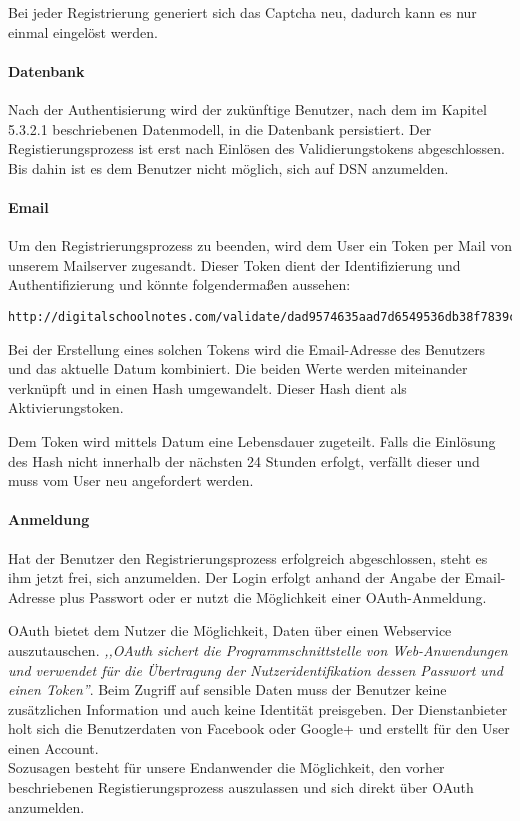 Bei jeder Registrierung generiert sich das Captcha neu, dadurch kann es nur einmal eingelöst werden.


\newpage

\paragraph{Datenbank}
Nach der Authentisierung wird der zukünftige Benutzer, nach dem im Kapitel 5.3.2.1 beschriebenen Datenmodell, in die Datenbank persistiert. Der Registierungsprozess ist erst nach Einlösen des Validierungstokens abgeschlossen. Bis dahin ist es dem Benutzer nicht möglich, sich auf DSN anzumelden.

\paragraph{Email}
Um den Registrierungsprozess zu beenden, wird dem User ein Token per Mail von unserem Mailserver zugesandt. Dieser Token dient der Identifizierung und Authentifizierung und könnte folgendermaßen aussehen:
\begin{lstlisting}[caption={Validierungstoken für die Aktivierung des DSN-Accounts}]
http://digitalschoolnotes.com/validate/dad9574635aad7d6549536db38f7839c042f7704b3bd74acc427f075d0601470
\end{lstlisting}

Bei der Erstellung eines solchen Tokens wird die Email-Adresse des Benutzers und das aktuelle Datum kombiniert. Die beiden Werte werden miteinander verknüpft und in einen Hash umgewandelt. Dieser Hash dient als Aktivierungstoken.

Dem Token wird mittels Datum eine Lebensdauer zugeteilt. Falls die Einlösung des Hash nicht innerhalb der nächsten 24 Stunden erfolgt, verfällt dieser und muss vom User neu angefordert werden. 

\paragraph{Anmeldung}
Hat der Benutzer den Registrierungsprozess erfolgreich abgeschlossen, steht es ihm jetzt frei, sich anzumelden. Der Login erfolgt anhand der Angabe der Email-Adresse plus Passwort oder er nutzt die Möglichkeit einer OAuth-Anmeldung.

OAuth bietet dem Nutzer die Möglichkeit, Daten über einen Webservice auszutauschen. \textit{,,OAuth sichert die Programmschnittstelle von Web-Anwendungen und verwendet für die Übertragung der Nutzeridentifikation dessen Passwort und einen Token''}\cite{OAUTH}. Beim Zugriff auf sensible Daten muss der Benutzer keine zusätzlichen Information und auch keine Identität preisgeben. Der Dienstanbieter holt sich die Benutzerdaten von Facebook oder Google+ und erstellt für den User einen Account.\\
Sozusagen besteht für unsere Endanwender die Möglichkeit, den vorher beschriebenen Registierungsprozess auszulassen und sich direkt über OAuth anzumelden.


